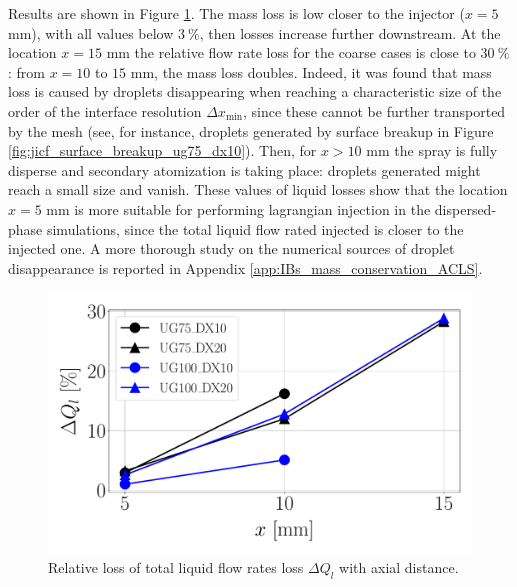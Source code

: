 Results are shown in Figure \ref{fig:delta_Ql_with_x}. The mass loss is low closer to the injector ($x = 5$ mm), with all values below $3~\%$, then losses increase further downstream.  At the location $x = 15$ mm the relative flow rate loss for the coarse cases is close to $30~\%$: from $x = 10$ to $15$ mm, the mass loss doubles. Indeed, it was found that mass loss is caused by droplets disappearing when reaching a characteristic size of the order of the interface resolution $\Delta x_\mathrm{min}$, since these cannot be further transported by the mesh (see, for instance, droplets generated by surface breakup in Figure \ref{fig:jicf_surface_breakup_ug75_dx10}). Then, for $x > 10$ mm the spray is fully disperse and secondary atomization is taking place: droplets generated might reach a small size and vanish. These values of liquid losses show that the location $x = 5$ mm is more suitable for performing lagrangian injection in the dispersed-phase simulations, since the total liquid flow rated injected is closer to the injected one. A more thorough study on the numerical sources of droplet disappearance is reported in Appendix \ref{app:IBs_mass_conservation_ACLS}.

\begin{figure}[ht]
	\centering
   \includegraphics[scale=0.3]{./part2_developments/figures_ch5_resolved_JICF/flow_rates_ibs/Ql_loss_with_x}
   \vspace*{-0.1in}
   \caption{Relative loss of total liquid flow rates loss $\Delta Q_l$ with axial distance.}
   \label{fig:delta_Ql_with_x}
\end{figure}

